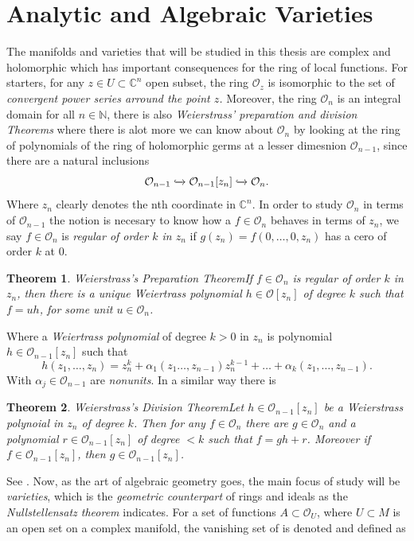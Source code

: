\documentclass[12pt,twoside,a4paper]{report}
\newtheorem{theorem}{Theorem}[section]
\newcommand{\nat}{\ensuremath{ \mathbb N }}
\newcommand{\con}{\ensuremath{\mathbb{C}^n}}
\newcommand{\osheaf}{\ensuremath{\mathcal O }}
\begin{document}
  \section{Analytic and Algebraic Varieties}
  \noindent The manifolds and varieties that will be studied in this thesis are complex and holomorphic which has important consequences for the ring of local functions. For starters, for any $z\in U\subset\con$ open subset, the ring $\osheaf_{z}$ is isomorphic to the set of \emph{convergent power series arround the point $z$.} Moreover, the ring $\osheaf_{n}$ is an integral domain for all $n\in\nat$, there is also \emph{Weierstrass' preparation and division Theorems} where there is alot more we can know about $\osheaf_{n}$ by looking at the ring of polynomials of the ring of holomorphic germs at a lesser dimesnion $\osheaf_{n-1}$, since there are a natural inclusions
  \[
    \osheaf_{n-1}\xhookrightarrow{}\osheaf_{n-1}[z_{n}]\xhookrightarrow{}\osheaf_{n}.
  \]
  Where $z_{n}$ clearly denotes the nth coordinate in $\con$. In order to study $\osheaf_{n}$ in terms of $\osheaf_{n-1}$ the notion is necesary to know how a $f\in\osheaf_{n}$ behaves in terms of $z_{n}$, we say $f\in\osheaf_{n}$ is \emph{regular of order $k$ in $z_{n}$} if $g(z_{n})=f(0,\dots,0,z_{n})$ has a cero of order $k$ at $0$.
  \begin{theorem}{Weierstrass's Preparation Theorem}\label{weier-prep}
  If $f\in\osheaf_{n}$ is regular of order $k$ in $z_{n}$, then there is a unique \emph{Weiertrass polynomial} $h\in\osheaf[z_{n}]$ of degree $k$ such that $f=uh$, for some unit $u\in\osheaf_{n}$.
  \end{theorem}
  Where a \emph{Weiertrass polynomial} of degree $k>0$ in $z_{n}$ is polynomial $h\in\osheaf_{n-1}[z_{n}]$ such that
  \[
    h(z_{1},\dots,z_{n})=z_{n}^{k}+\alpha_{1}(z_{1}\dots,z_{n-1})z_{n}^{k-1}+\dots+\alpha_{k}(z_{1},\dots,z_{n-1}).
  \]
  With $\alpha_{j}\in\osheaf_{n-1}$ are \emph{nonunits}. In a similar way there is
  \begin{theorem}{Weierstrass's Division Theorem}\label{weier-div}
    Let $h\in\osheaf_{n-1}[z_{n}]$ be a \emph{Weierstrass polynoial in $z_{n}$} of degree $k$. Then for any $f\in\osheaf_{n}$ there are $g\in\osheaf_{n}$ and a polynomial $r\in\osheaf_{n-1}[z_{n}]$ of degree $<k$ such that $f=gh+r$. Moreover if $f\in\osheaf_{n-1}[z_{n}]$, then $g\in\osheaf_{n-1}[z_{n}]$.
  \end{theorem}
  See \cite{Gunning-Rossi}. Now, as the art of algebraic geometry goes, the main focus of study will be \emph{varieties}, which is the \emph{geometric counterpart} of rings and ideals as the \emph{Nullstellensatz theorem} indicates. For a set of functions $A\subset\osheaf_{U}$, where $U\subset M$ is an open set on a complex manifold, the vanishing set of is denoted and defined as
\end{document}
